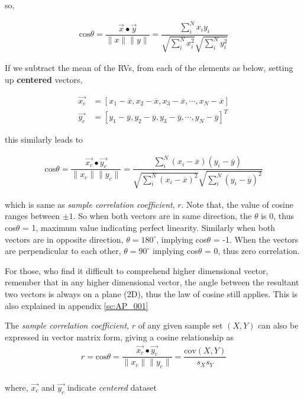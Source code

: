 \documentclass[tikz = true, float=false, crop=false, 11pt]{standalone}
\begin{document}
	so,
	
	$$\begin{aligned}
	\mathrm{cos}\theta = \dfrac{\vec{x} \bullet \vec{y}}{\lVert x \rVert \lVert y \rVert}  = \dfrac{\sum_i^N x_i y_i}{\sqrt{\sum_i^N x_i^2}\sqrt{\sum_i^N y_i^2}}
	\end{aligned}$$
	
	If we subtract the mean of the RVs, from each of the elements as below, setting up  \textbf{centered} vectors, 
	
	$$\begin{aligned}
		\vec{x_c} &= [x_1 - \overline{x}, x_2 - \overline{x}, x_3 - \overline{x}, \cdots, x_N - \overline{x}] \\
		\vec{y_c} &= [y_1 - \overline{y}, y_2 - \overline{y}, y_3 - \overline{y}, \cdots, y_N - \overline{y}]^T
	\end{aligned}$$	
	
	this similarly leads to 
	
	$$\begin{aligned}
	\mathrm{cos}\theta = \dfrac{\vec{x_c} \bullet \vec{y_c}}{\lVert x_c \rVert \lVert y_c \rVert}  = \dfrac{\sum_i^N (x_i - \overline{x}) (y_i - \overline{y}) }{ \sqrt{\sum_i^N (x_i - \overline{x})^2}\sqrt{\sum_i^N (y_i - \overline{y})^2} }
	\end{aligned}$$
	
	which is same as \textit{sample correlation coefficient}, $r$. Note that, the value of cosine ranges between $\pm 1$. So when both vectors are in same direction, the $\theta$ is 0, thus cos$\theta$ = 1, maximum value indicating perfect linearity. Similarly when both vectors are in opposite direction, $\theta = 180^{\circ}$, implying cos$\theta$ = -1. When the vectors are perpendicular to each other, $\theta = 90^{\circ}$ implying cos$\theta$ = 0, thus zero correlation. 
	
	For those, who find it difficult to comprehend higher dimensional vector, remember that in any higher dimensional vector, the angle between the resultant two vectors is always on a plane (2D), thus the law of cosine still applies. This is also explained in appendix \ref{sc:AP_001}
	
	\begin{tcolorbox}[colback=green!5,colframe=green!40!black,title=Cosine Similarity]
	The \textit{sample correlation coefficient}, $r$ of any given sample set $(X,Y)$  can also be expressed in vector matrix form, giving a cosine relationship as
	\begin{align}
		r = \mathrm{cos}\theta = \dfrac{\vec{x_c} \bullet \vec{y_c}}{\lVert x_c \rVert \lVert y_c \rVert} = \dfrac{\mathrm{cov}(X,Y)}{s_Xs_Y} \label{eq:C6_003}
	\end{align} \\
	where, $\vec{x_c}$ and $\vec{y_c}$ indicate \textit{centered} dataset
	\end{tcolorbox}		
	
	
\end{document}
